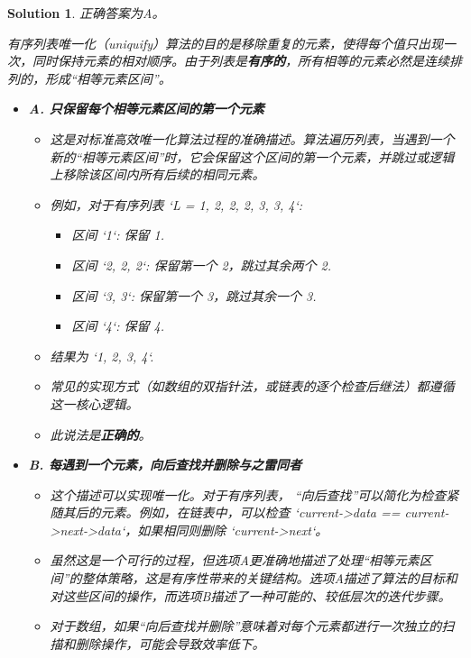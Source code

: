 \documentclass[UTF8]{report}
\newtheorem{solution}{Solution}
\theoremstyle{MyLineTheoremStyle} %
\theoremstyle{MyBlockTheoremStyle} %
\theoremstyle{MySubsubsectionStyle} %
\begin{document}
\begin{solution}
正确答案为A。

有序列表唯一化（uniquify）算法的目的是移除重复的元素，使得每个值只出现一次，同时保持元素的相对顺序。由于列表是\textbf{有序的}，所有相等的元素必然是连续排列的，形成“相等元素区间”。

\begin{itemize}
    \item \textbf{A. 只保留每个相等元素区间的第一个元素}
    \begin{itemize}
        \item 这是对标准高效唯一化算法过程的准确描述。算法遍历列表，当遇到一个新的“相等元素区间”时，它会保留这个区间的第一个元素，并跳过或逻辑上移除该区间内所有后续的相同元素。
        \item 例如，对于有序列表 `L = {1, 2, 2, 2, 3, 3, 4}`:
        \begin{itemize}
            \item 区间 `{1}`: 保留 1.
            \item 区间 `{2, 2, 2}`: 保留第一个 2，跳过其余两个 2.
            \item 区间 `{3, 3}`: 保留第一个 3，跳过其余一个 3.
            \item 区间 `{4}`: 保留 4.
        \end{itemize}
        \item 结果为 `{1, 2, 3, 4}`.
        \item 常见的实现方式（如数组的双指针法，或链表的逐个检查后继法）都遵循这一核心逻辑。
        \item 此说法是\textbf{正确的}。
    \end{itemize}

    \item \textbf{B. 每遇到一个元素，向后查找并删除与之雷同者}
    \begin{itemize}
        \item 这个描述可以实现唯一化。对于有序列表， “向后查找”可以简化为检查紧随其后的元素。例如，在链表中，可以检查 `current->data == current->next->data`，如果相同则删除 `current->next`。
        \item 虽然这是一个可行的过程，但选项A更准确地描述了处理“相等元素区间”的整体策略，这是有序性带来的关键结构。选项A描述了算法的目标和对这些区间的操作，而选项B描述了一种可能的、较低层次的迭代步骤。
        \item 对于数组，如果“向后查找并删除”意味着对每个元素都进行一次独立的扫描和删除操作，可能会导致效率低下。
    \end{itemize}


\end{itemize}
\end{solution}
\end{document}
